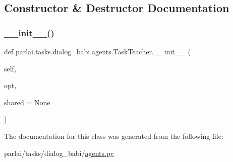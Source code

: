 \subsection{Constructor \& Destructor Documentation}
\mbox{\label{classparlai_1_1tasks_1_1dialog__babi_1_1agents_1_1TaskTeacher_a04ad8a9d7b96a3115bc3661bb875eeef}} 
\subsubsection{\texorpdfstring{\+\_\+\+\_\+init\+\_\+\+\_\+()}{\_\_init\_\_()}}
{\footnotesize\ttfamily def parlai.\+tasks.\+dialog\+\_\+babi.\+agents.\+Task\+Teacher.\+\_\+\+\_\+init\+\_\+\+\_\+ (\begin{DoxyParamCaption}\item[{}]{self,  }\item[{}]{opt,  }\item[{}]{shared = {\ttfamily None} }\end{DoxyParamCaption})}



The documentation for this class was generated from the following file\+:\begin{DoxyCompactItemize}
\item 
parlai/tasks/dialog\+\_\+babi/\hyperlink{parlai_2tasks_2dialog__babi_2agents_8py}{agents.\+py}\end{DoxyCompactItemize}
